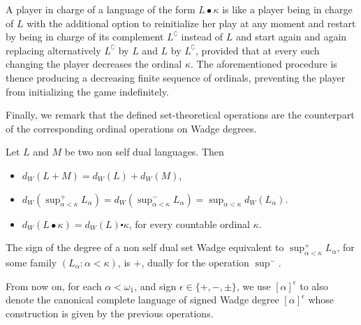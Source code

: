 A player in  charge of a language of the form $L\bullet \kappa$ is like a player being in charge of $L$ with the additional option to reinitialize her play at any moment and restart by being 
in charge of its complement $L^\complement$ instead of $L$ and start again and again replacing alternatively $L^\complement$ by $L$ and  $L$ by 
$L^\complement$,  provided that at every such changing the player decreases the ordinal $\kappa$.  The aforementioned procedure is thence producing a decreasing finite sequence of ordinals, preventing the player from initializing the game indefinitely.


Finally, we remark that  the defined set-theoretical operations are the counterpart of the corresponding ordinal operations on Wadge degrees.

\begin{lemma}
\label{r_mult}
Let $L$ and $ M$ be two non self dual languages. Then 
\begin{itemize}
\item $d_W(L+M)=d_W(L)+d_W(M)$, 
\item$d_W(\sup^+ _{\alpha < \kappa} L_\alpha)= d_W(\sup^- _{\alpha < \kappa} L_\alpha)=\sup_{\alpha < \kappa}d_W( L_\alpha)$.
\item $d_W(L \bullet \kappa)= d_W(L) \centerdot \kappa$, for every countable ordinal $\kappa$.
\end{itemize}
\end{lemma}

The sign of the degree of a non self dual set Wadge equivalent 
to $\sup^+ _{\alpha < \kappa} L_\alpha$, for some   family $(L_\alpha: \alpha < \kappa)$, is $+$, dually for the operation $\sup^-$. 

From now on, for each $\alpha < \omega_1$, and sign $\epsilon \in \{+,-,\pm\}$, we use  $[\alpha]^\epsilon$ to also denote the canonical complete language of signed Wadge degree $[\alpha]^\epsilon$ whose construction is given by the previous operations.

